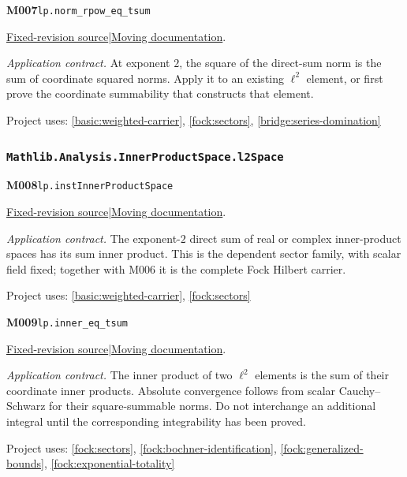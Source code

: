 \documentclass[11pt,a4paper]{article}
\theoremstyle{definition}
\theoremstyle{remark}
\begin{document}
\noindent\textbf{M007}\label{base:M007}\quad\nolinkurl{lp.norm_rpow_eq_tsum}

\href{https://github.com/leanprover-community/mathlib4/blob/9bac2d0692944a775113f7c130fd5e5b4608a854/Mathlib/Analysis/Normed/Lp/lpSpace.lean}{Fixed-revision source}\quad|\quad\href{https://leanprover-community.github.io/mathlib4_docs/Mathlib/Analysis/Normed/Lp/lpSpace.html#lp.norm_rpow_eq_tsum}{Moving documentation}.\par
\noindent\textit{Application contract.} At exponent $2$, the square of the direct-sum norm is the sum of coordinate squared norms. Apply it to an existing $\ell^2$ element, or first prove the coordinate summability that constructs that element.\par
{\small Project uses: \ref{basic:weighted-carrier}, \ref{fock:sectors}, \ref{bridge:series-domination}}\par\medskip

\subsubsection*{\nolinkurl{Mathlib.Analysis.InnerProductSpace.l2Space}}
\noindent\textbf{M008}\label{base:M008}\quad\nolinkurl{lp.instInnerProductSpace}

\href{https://github.com/leanprover-community/mathlib4/blob/9bac2d0692944a775113f7c130fd5e5b4608a854/Mathlib/Analysis/InnerProductSpace/l2Space.lean}{Fixed-revision source}\quad|\quad\href{https://leanprover-community.github.io/mathlib4_docs/Mathlib/Analysis/InnerProductSpace/l2Space.html#lp.instInnerProductSpace}{Moving documentation}.\par
\noindent\textit{Application contract.} The exponent-$2$ direct sum of real or complex inner-product spaces has its sum inner product. This is the dependent sector family, with scalar field fixed; together with M006 it is the complete Fock Hilbert carrier.\par
{\small Project uses: \ref{basic:weighted-carrier}, \ref{fock:sectors}}\par\medskip

\noindent\textbf{M009}\label{base:M009}\quad\nolinkurl{lp.inner_eq_tsum}

\href{https://github.com/leanprover-community/mathlib4/blob/9bac2d0692944a775113f7c130fd5e5b4608a854/Mathlib/Analysis/InnerProductSpace/l2Space.lean}{Fixed-revision source}\quad|\quad\href{https://leanprover-community.github.io/mathlib4_docs/Mathlib/Analysis/InnerProductSpace/l2Space.html#lp.inner_eq_tsum}{Moving documentation}.\par
\noindent\textit{Application contract.} The inner product of two $\ell^2$ elements is the sum of their coordinate inner products. Absolute convergence follows from scalar Cauchy--Schwarz for their square-summable norms. Do not interchange an additional integral until the corresponding integrability has been proved.\par
{\small Project uses: \ref{fock:sectors}, \ref{fock:bochner-identification}, \ref{fock:generalized-bounds}, \ref{fock:exponential-totality}}\par\medskip
\end{document}
